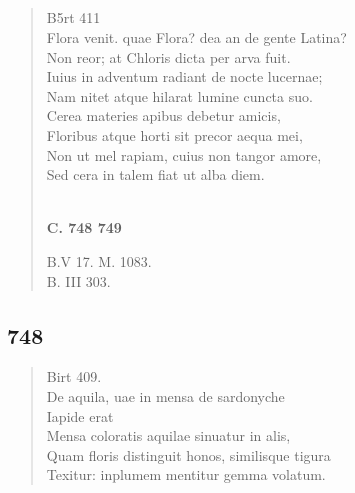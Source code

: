 \documentclass[11pt, a4paper]{report}
\begin{document}
            \subsection*{}
      \begin{verse}
      B5rt 411 \\ Flora venit. quae Flora? dea an de gente Latina? \\ Non reor; at Chloris dicta per arva fuit. \\ Iuius in adventum radiant de nocte lucernae; \\ Nam nitet atque hilarat lumine cuncta suo. \\ Cerea materies apibus debetur amicis, \\ Floribus atque horti sit precor aequa mei, \\ Non ut mel rapiam, cuius non tangor amore, \\ Sed cera in talem fiat ut alba diem. \\ 
        ﻿\pagebreak 
     \marginpar{[232]} \begin{center} \textbf{C. 748 749} \end{center}B.V 17. M. 1083. \\ B. III 303. \\ 
      \end{verse}
  
            \subsection*{748}
      \begin{verse}
      Birt 409. \\ De aquila, uae in mensa de sardonyche \\ Iapide erat \\ Mensa coloratis aquilae sinuatur in alis, \\ Quam floris distinguit honos, similisque tigura \\ Texitur: inplumem mentitur gemma volatum. \\ 
      \end{verse}
  
\end{document}
